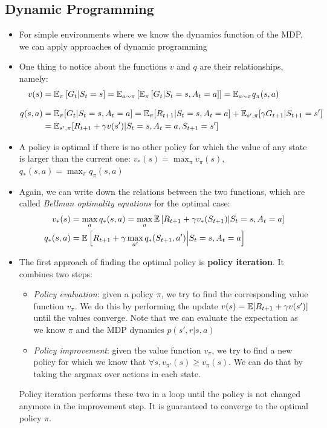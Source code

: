 \subsection{Dynamic Programming}
\begin{itemize}
	\item For simple environments where we know the dynamics function of the MDP, we can apply approaches of dynamic programming
	\item One thing to notice about the functions $v$ and $q$ are their relationships, namely:
	\begin{equation*}
		\begin{split}
			v(s) & = \mathbb{E}_{\pi}\left[G_t|S_t=s\right] = \mathbb{E}_{a\sim\pi}\left[\mathbb{E}_{\pi}\left[G_t|S_t=s,A_t=a\right]\right] = \mathbb{E}_{a\sim\pi} q_{\pi}(s,a)\\[8pt]
			q(s,a) & = \mathbb{E}_{\pi}[G_t|S_t=s,A_t=a] = \mathbb{E}_{\pi}[R_{t+1}|S_t=s,A_t=a]+\mathbb{E}_{s',\pi}[\gamma G_{t+1}|S_{t+1}=s'] \\& = \mathbb{E}_{s',\pi}[R_{t+1}+\gamma v(s')|S_t=s,A_t=a,S_{t+1}=s']
		\end{split}
	\end{equation*}
	\item A policy is optimal if there is no other policy for which the value of any state is larger than the current one: $v_{*}(s)=\max_{\pi} v_{\pi}(s)$, $q_{*}(s,a)=\max_{\pi} q_{\pi}(s,a)$
	\item Again, we can write down the relations between the two functions, which are called \textit{Bellman optimality equations} for the optimal case:
	\begin{equation*}
		\begin{split}
			v_{*}(s) & =\max_{a}q_{*}(s,a)= \max_a \mathbb{E}\left[R_{t+1}+\gamma v_{*}(S_{t+1})|S_t=s,A_t=a\right]\\
			q_{*}(s,a) & = \mathbb{E}\left[R_{t+1}+\gamma \max_{a'} q_{*}(S_{t+1},a')\Big\vert S_t=s,A_t=a\right]
		\end{split}
	\end{equation*}
	
	\item The first approach of finding the optimal policy is \textbf{policy iteration}. It combines two steps:
	\begin{itemize}
		\item \textit{Policy evaluation}: given a policy $\pi$, we try to find the corresponding value function $v_{\pi}$. We do this by performing the update $v(s)=\mathbb{E}[R_{t+1}+\gamma v(s')]$ until the values converge. Note that we can evaluate the expectation as we know $\pi$ and the MDP dynamics $p(s',r|s,a)$
		\item \textit{Policy improvement}: given the value function $v_{\pi}$, we try to find a new policy for which we know that $\forall s, v_{\pi'}(s)\geq v_{\pi}(s)$. We can do that by taking the argmax over actions in each state.
	\end{itemize}
	Policy iteration performs these two in a loop until the policy is not changed anymore in the improvement step. It is guaranteed to converge to the optimal policy $\pi$.
	

\end{itemize}
